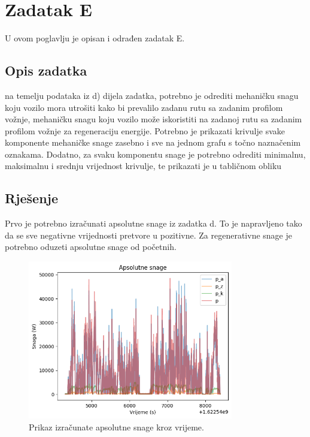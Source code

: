 \chapter{Zadatak E} \label{ch:e}

U ovom poglavlju je opisan i odrađen zadatak E.

\section{Opis zadatka} \label{sec:e:opis}
na temelju podataka iz d) dijela zadatka, potrebno je odrediti mehaničku snagu koju vozilo mora
utrošiti kako bi prevalilo zadanu rutu sa zadanim profilom vožnje, mehaničku snagu koju vozilo može
iskoristiti na zadanoj rutu sa zadanim profilom vožnje za regeneraciju energije. Potrebno je prikazati
krivulje svake komponente mehaničke snage zasebno i sve na jednom grafu s točno naznačenim
oznakama. Dodatno, za svaku komponentu snage je potrebno odrediti minimalnu, maksimalnu i
srednju vrijednost krivulje, te prikazati je u tabličnom obliku

\section{Rješenje} \label{sec:e:rjesenje}
Prvo je potrebno izračunati apsolutne snage iz zadatka d. To je napravljeno tako da se sve negativne
vrijednosti pretvore u pozitivne. Za regenerativne snage je potrebno oduzeti apsolutne snage od početnih.

\begin{figure}
    \centering
    \includegraphics[width=0.8\textwidth]{images/abs_powes.png}
    \caption{Prikaz izračunate apsolutne snage kroz vrijeme.}
    \label{fig:e:abs_power_graph}
\end{figure}

